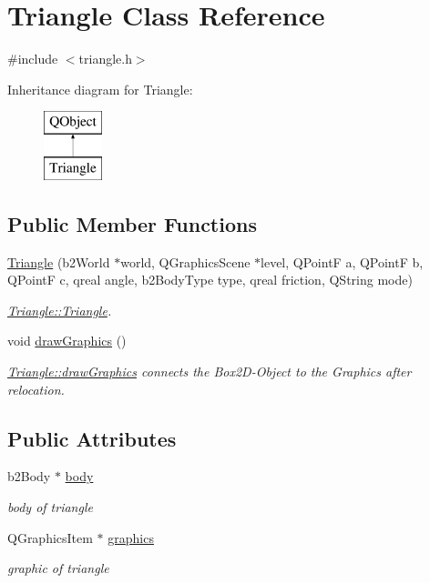 \hypertarget{class_triangle}{}\section{Triangle Class Reference}
\label{class_triangle}


{\ttfamily \#include $<$triangle.\+h$>$}

Inheritance diagram for Triangle\+:\begin{figure}[H]
\begin{center}
\leavevmode
\includegraphics[height=2.000000cm]{class_triangle}
\end{center}
\end{figure}
\subsection*{Public Member Functions}
\begin{DoxyCompactItemize}
\item 
\hyperlink{class_triangle_a47f2b3f39a014d432f7a42d84f443370}{Triangle} (b2\+World $\ast$world, Q\+Graphics\+Scene $\ast$level, Q\+PointF a, Q\+PointF b, Q\+PointF c, qreal angle, b2\+Body\+Type type, qreal friction, Q\+String mode)
\begin{DoxyCompactList}\small\item\em \hyperlink{class_triangle_a47f2b3f39a014d432f7a42d84f443370}{Triangle\+::\+Triangle}. \end{DoxyCompactList}\item 
void \hyperlink{class_triangle_a37c8163fef65a3979e7cc8b076db936c}{draw\+Graphics} ()
\begin{DoxyCompactList}\small\item\em \hyperlink{class_triangle_a37c8163fef65a3979e7cc8b076db936c}{Triangle\+::draw\+Graphics} connects the Box2\+D-\/\+Object to the Graphics after relocation. \end{DoxyCompactList}\end{DoxyCompactItemize}
\subsection*{Public Attributes}
\begin{DoxyCompactItemize}
\item 
b2\+Body $\ast$ \hyperlink{class_triangle_a342320abc2a212d7f6a86a262ac438b6}{body}
\begin{DoxyCompactList}\small\item\em body of triangle \end{DoxyCompactList}\item 
Q\+Graphics\+Item $\ast$ \hyperlink{class_triangle_a914fac6f6bdac1dd191f82f5a5443646}{graphics}
\begin{DoxyCompactList}\small\item\em graphic of triangle \end{DoxyCompactList}\end{DoxyCompactItemize}


